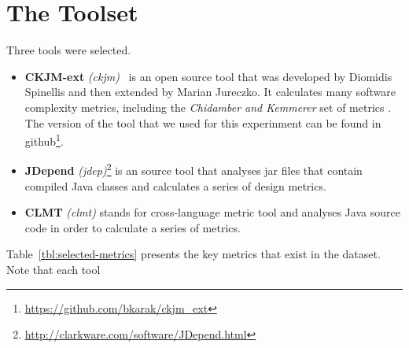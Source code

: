 \documentclass{sig-alternate}
\begin{document}
\section{The Toolset}

Three tools were selected.

\begin{itemize}
  \item \textbf{CKJM-ext} \textit{(ckjm)}~\cite{Spi05g} is an open source tool that was developed by Diomidis Spinellis and then extended by Marian Jureczko. It calculates many software complexity metrics, including the \textit{Chidamber and Kemmerer} set of metrics \cite{CHKE94}. The version of the tool that we used for this experinment can be found in github\footnote{\url{https://github.com/bkarak/ckjm_ext}}.

  \item \textbf{JDepend} \textit{(jdep)}\footnote{\url{http://clarkware.com/software/JDepend.html}} is an source tool that analyses {\sc jar} files that contain compiled Java classes and calculates a series of design metrics.

  \item \textbf{CLMT} \textit{(clmt)} stands for cross-language metric tool and analyses Java source code in order to calculate a series of metrics.
\end{itemize}

Table~\ref{tbl:selected-metrics} presents the key metrics that exist in the dataset. Note that each tool
\end{document}
